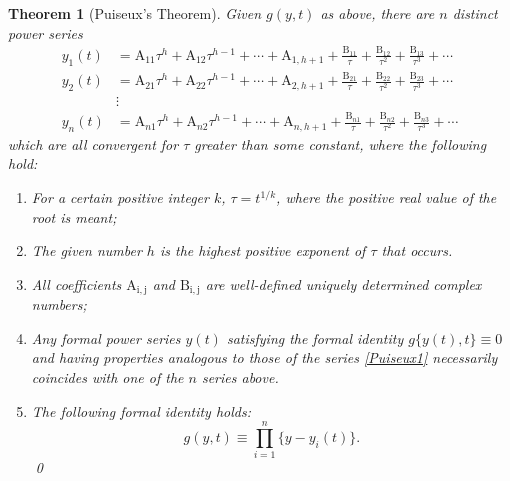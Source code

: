 \documentclass{article}
\theoremstyle{plain}
\newtheorem{thm}{Theorem}
\theoremstyle{definition}
\newcommand{\hideqed}{\renewcommand{\qed}{}} %
\begin{document}
\begin{thm}[Puiseux's Theorem] %
Given $g(y,t)$ as above, there are $n$
distinct  power series
\begin{equation}
\label{Puiseux1} %
\begin{split}
y_1(t) &= \mathrm{A}_{11}\tau^h + \mathrm{A}_{12}\tau^{h-1} 
+\cdots+ \mathrm{A}_{1,h+1} + \frac{\mathrm{B}_{11}}{\tau} 
+ \frac{\mathrm{B}_{12}}{\tau^2} + \frac{\mathrm{B}_{13}}{\tau^3} 
+ \cdots
\\
y_2(t) &= \mathrm{A}_{21}\tau^h + \mathrm{A}_{22}\tau^{h-1} 
+\cdots+ \mathrm{A}_{2,h+1} + \frac{\mathrm{B}_{21}}{\tau} 
+ \frac{\mathrm{B}_{22}}{\tau^2} + \frac{\mathrm{B}_{23}}{\tau^3} 
+ \cdots
\\
 & \vdots
\\
y_n(t) &= \mathrm{A}_{n1}\tau^h + \mathrm{A}_{n2}\tau^{h-1} 
+\cdots+ \mathrm{A}_{n,h+1} + \frac{\mathrm{B}_{n1}}{\tau} 
+ \frac{\mathrm{B}_{n2}}{\tau^2} + \frac{\mathrm{B}_{n3}}{\tau^3} 
+ \cdots
\end{split}
\end{equation}
which are all convergent for 
$\tau$
greater than some constant, where the following hold:
\begin{enumerate}
\item %
For a certain positive integer $k$, $\tau = t^{1/k}$, where the
positive real value of the root is meant;
\item %
The given number $h$ is the highest positive exponent of $\tau$ that
occurs.
\item %
All coefficients $\mathrm{A_{i,j}}$ and $\mathrm{B_{i,j}}$ are well-defined uniquely determined complex numbers;
\item %
Any formal power series $y(t)$ satisfying the formal identity
$g\{y(t),t\}\equiv 0$ and having properties analogous to those of the
series \eqref{Puiseux1} necessarily coincides with one of
the $n$ series above.
\item %
The following formal identity holds:
\[
g(y,t) \equiv \prod_{i=1}^{n} \{y - y_i(t)\}.  
\]
\qed
\end{enumerate}
\hideqed
\end{thm}
\end{document}
